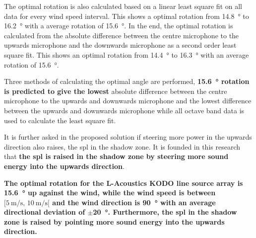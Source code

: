 The optimal rotation is also calculated based on a linear least square fit on all data for every wind speed interval. This shows a optimal rotation from \SI{14.8}{\degree} to \SI{16.2}{\degree} with a average rotation of \SI{15.6}{\degree}. In the end, the optimal rotation is calculated from the absolute difference between the centre microphone to the upwards microphone and the downwards microphone as a second order least square fit. This shows an optimal rotation from \SI{14.4}{\degree} to \SI{16.3}{\degree} with an average rotation of \SI{15.6}{\degree}. 

Three methods of calculating the optimal angle are performed, \textbf{\SI{15.6}{\degree} rotation is predicted to give the lowest} absolute difference between the centre microphone to the upwards and downwards microphone and the lowest difference between the upwards and downwards microphone while all octave band data is used to calculate the least square fit.

It is further asked in the proposed solution if steering more power in the upwards direction also raises, the \gls{spl} in the shadow zone. It is founded in this research that  \textbf{the \gls{spl} is raised in the shadow zone by steering more sound energy into the upwards direction}.

\textbf{ The optimal rotation for the L-Acoustics KODO line source array is \SI{15.6}{\degree} up against the wind, while the wind speed is between $[\SI{5}{\meter\per\second},\, \SI{10}{\meter\per\second}[ $ and the wind direction is \SI{90}{\degree} with an average directional deviation of $\pm$\SI{20}{\degree}. Furthermore, the \gls{spl} in the shadow zone is raised by pointing more sound energy into the upwards direction. }





